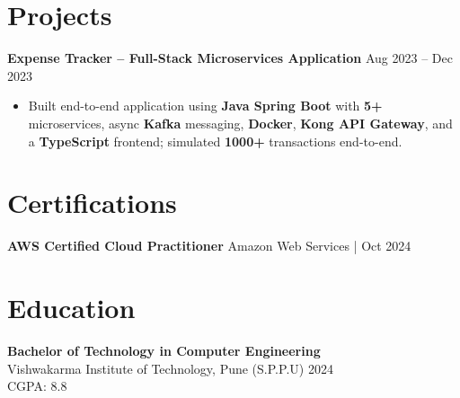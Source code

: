 \documentclass[letterpaper,10pt]{article}
\begin{document}
\section*{Projects}

\textbf{Expense Tracker -- Full-Stack Microservices Application} \hfill Aug 2023 -- Dec 2023
\begin{itemize}[leftmargin=*]
    \item Built end-to-end application using \textbf{Java Spring Boot} with \textbf{5+} microservices, async \textbf{Kafka} messaging, \textbf{Docker}, \textbf{Kong API Gateway}, and a \textbf{TypeScript} frontend; simulated \textbf{1000+} transactions end-to-end.
\end{itemize}

\section*{Certifications}
\textbf{AWS Certified Cloud Practitioner} \hfill Amazon Web Services \;|\; Oct 2024 \\

\section*{Education}
\textbf{Bachelor of Technology in Computer Engineering} \\
Vishwakarma Institute of Technology, Pune (S.P.P.U) \hfill 2024 \\
CGPA: 8.8
\end{document}
